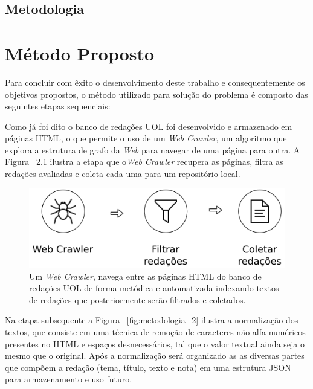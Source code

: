\section{Metodologia}
\chapter{Método Proposto}\label{meto}

Para concluir com êxito o desenvolvimento deste trabalho e consequentemente os objetivos propostos, o método utilizado para solução do problema é composto das seguintes etapas sequenciais:

Como já foi dito o banco de redações UOL foi desenvolvido e armazenado em páginas HTML, o que permite o uso de um \textit{Web Crawler}, um algoritmo que explora a estrutura de grafo da \textit{Web} para navegar de uma página para outra. A Figura ~\ref{fig:metodologia_1} ilustra a etapa que o\textit{Web Crawler} recupera as páginas, filtra as redações avaliadas e coleta cada uma para um repositório local.

\begin{figure}[H]
\begin{center}
    \includegraphics[scale=0.75]{images/metodologia_1.png}
\end{center}
\caption{Um \textit{Web Crawler}, navega entre as páginas HTML do banco de redações UOL de forma metódica e automatizada indexando textos de redações que posteriormente serão filtrados e coletados.}
\label{fig:metodologia_1}
\end{figure}

Na etapa subsequente a Figura ~\ref{fig:metodologia_2} ilustra a normalização dos textos, que consiste em uma técnica de remoção de caracteres não alfa-numéricos presentes no HTML e espaços desnecessários, tal que o valor textual ainda seja o mesmo que o original. Após a normalização será organizado as as diversas partes que compõem a redação (tema, título, texto e nota) em uma estrutura JSON para armazenamento e uso futuro. 

